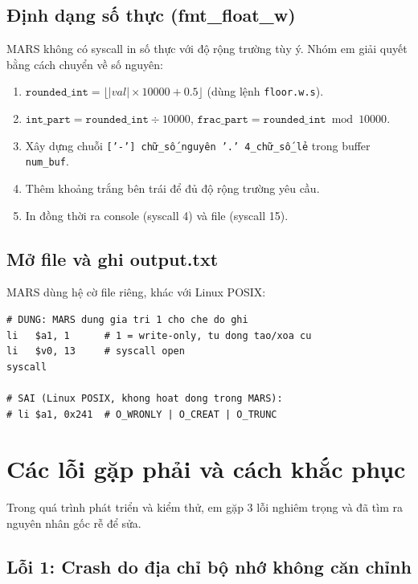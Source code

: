\documentclass[twoside,final]{hcmut-report}
\begin{document}
\subsection{Định dạng số thực (fmt\_float\_w)}

MARS không có syscall in số thực với độ rộng trường tùy ý. Nhóm em
giải quyết bằng cách chuyển về số nguyên:

\begin{enumerate}
  \item $\texttt{rounded\_int} = \lfloor |val| \times 10000 + 0.5 \rfloor$
        (dùng lệnh \texttt{floor.w.s}).
  \item $\texttt{int\_part} = \texttt{rounded\_int} \div 10000$,\quad
        $\texttt{frac\_part} = \texttt{rounded\_int} \bmod 10000$.
  \item Xây dựng chuỗi \texttt{['-'] chữ\_số\_nguyên '.' 4\_chữ\_số\_lẻ}
        trong buffer \texttt{num\_buf}.
  \item Thêm khoảng trắng bên trái để đủ độ rộng trường yêu cầu.
  \item In đồng thời ra console (syscall 4) và file (syscall 15).
\end{enumerate}

\subsection{Mở file và ghi output.txt}

MARS dùng hệ cờ file riêng, khác với Linux POSIX:

\begin{lstlisting}[language={}, caption={Mở file output.txt trong MARS}]
# DUNG: MARS dung gia tri 1 cho che do ghi
li   $a1, 1      # 1 = write-only, tu dong tao/xoa cu
li   $v0, 13     # syscall open
syscall

# SAI (Linux POSIX, khong hoat dong trong MARS):
# li $a1, 0x241  # O_WRONLY | O_CREAT | O_TRUNC
\end{lstlisting}

\section{Các lỗi gặp phải và cách khắc phục}

Trong quá trình phát triển và kiểm thử, em gặp 3 lỗi nghiêm trọng
và đã tìm ra nguyên nhân gốc rễ để sửa.

\subsection{Lỗi 1: Crash do địa chỉ bộ nhớ không căn chỉnh}
\end{document}
